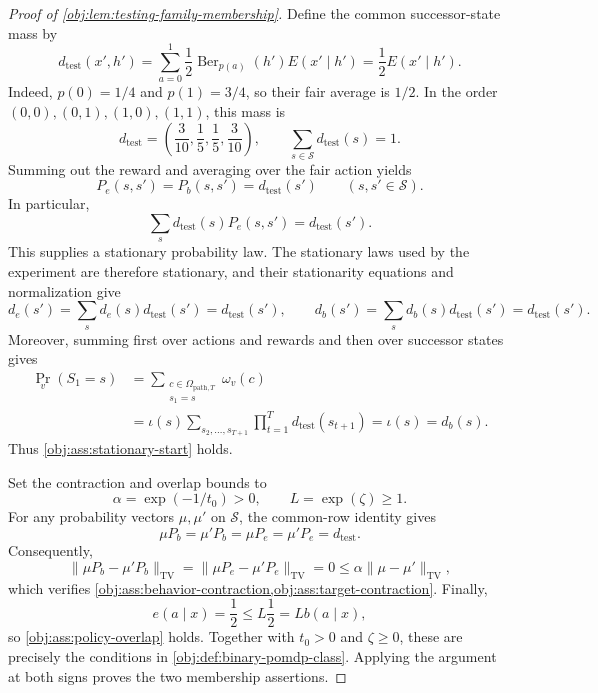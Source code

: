 \begin{proof}[Proof of \cref{obj:lem:testing-family-membership}]
Define the common successor-state mass by
\[
d_{\mathrm{test}}(x',h')
=
\sum_{a=0}^1\frac12
\operatorname{Ber}_{p(a)}(h')E(x'\mid h')
=\frac12E(x'\mid h').
\]
Indeed, \(p(0)=1/4\) and \(p(1)=3/4\), so their fair average is \(1/2\). In the order
\((0,0),(0,1),(1,0),(1,1)\), this mass is
\[
d_{\mathrm{test}}
=\left(\frac3{10},\frac15,\frac15,\frac3{10}\right),
\qquad
\sum_{s\in\mathcal S}d_{\mathrm{test}}(s)=1.
\]
Summing out the reward and averaging over the fair action yields
\[
P_e(s,s')=P_b(s,s')=d_{\mathrm{test}}(s')
\qquad(s,s'\in\mathcal S).
\]
In particular,
\[
\sum_s d_{\mathrm{test}}(s)P_e(s,s')
=d_{\mathrm{test}}(s').
\]
This supplies a stationary probability law. The stationary laws used by the experiment are therefore stationary, and their stationarity equations and normalization give
\[
d_e(s')
=\sum_s d_e(s)d_{\mathrm{test}}(s')
=d_{\mathrm{test}}(s'),
\qquad
d_b(s')
=\sum_s d_b(s)d_{\mathrm{test}}(s')
=d_{\mathrm{test}}(s').
\]
Moreover, summing first over actions and rewards and then over successor states gives
\[
\begin{aligned}
\Pr_v(S_1=s)
&=\sum_{\substack{c\in\Omega_{\mathrm{path},T}\\s_1=s}}\omega_v(c)\\
&=\iota(s)
  \sum_{s_2,\ldots,s_{T+1}}
       \prod_{t=1}^T d_{\mathrm{test}}(s_{t+1})
=\iota(s)=d_b(s).
\end{aligned}
\]
Thus \cref{obj:ass:stationary-start} holds.

Set the contraction and overlap bounds to
\[
\alpha=\exp(-1/t_0)>0,\qquad L=\exp(\zeta)\geq1.
\]
For any probability vectors \(\mu,\mu'\) on \(\mathcal S\), the common-row identity gives
\[
\mu P_b=\mu'P_b=\mu P_e=\mu'P_e=d_{\mathrm{test}}.
\]
Consequently,
\[
\|\mu P_b-\mu'P_b\|_{\mathrm{TV}}
=
\|\mu P_e-\mu'P_e\|_{\mathrm{TV}}
=0
\leq\alpha\|\mu-\mu'\|_{\mathrm{TV}},
\]
which verifies
\cref{obj:ass:behavior-contraction,obj:ass:target-contraction}.
Finally,
\[
e(a\mid x)=\frac12
\leq L\frac12=Lb(a\mid x),
\]
so \cref{obj:ass:policy-overlap} holds. Together with \(t_0>0\) and \(\zeta\geq0\), these are precisely the conditions in
\cref{obj:def:binary-pomdp-class}. Applying the argument at both signs proves the two membership assertions.


\end{proof}
